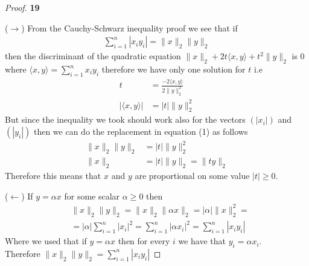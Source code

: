 \documentclass[11pt]{article}
\theoremstyle{definition}
\begin{document}
\cleardoublepage
	\begin{proof}{\textbf{19}}
        
        ($\rightarrow$) From the Cauchy-Schwarz inequality proof we see that if
        \begin{align}
            \sum_{i=1}^n |x_i y_i| = \|x\|_2 \|y\|_2
        \end{align}
        then the discriminant of the quadratic equation
        $\|x\|_2 + 2t\langle x,y \rangle + t^2 \|y\|_2$ is 0 where
        $\langle x,y \rangle = \sum_{i=1}^n x_iy_i$ therefore we have only one
        solution for $t$ i.e 
        \begin{align*}
            t &= \frac{-2\langle x,y \rangle}{2\|y\|_2^2}\\
            |\langle x,y \rangle| &= |t|\|y\|_2^2
        \end{align*}
        But since the inequality we took should work also for the vectors $(|x_i|)$
        and $(|y_i|)$ then we can do the replacement in equation (1) as follows
        \begin{align*}
            \|x\|_2\|y\|_2 &= |t|\|y\|_2^2\\
            \|x\|_2 &= |t|\|y\|_2 = \|ty\|_2
        \end{align*}
        Therefore this means that $x$ and $y$ are proportional on some value
        $|t| \geq 0$.

        ($\leftarrow$) If $y = \alpha x$ for some scalar $\alpha \geq 0$ then
        \begin{align*}
            &\|x\|_2\|y\|_2 = \|x\|_2\|\alpha x\|_2 = |\alpha|\|x\|_2^2 =\\
            & =|\alpha|\sum_{i=1}^n |x_i|^2 = \sum_{i=1}^n |\alpha x_i|^2 =
            \sum_{i=1}^n |x_i y_i|
        \end{align*}
        Where we used that if $y = \alpha x$ then for every $i$ we have that
        $y_i = \alpha x_i$.\\
        Therefore $\|x\|_2\|y\|_2 = \sum_{i=1}^n |x_i y_i|$
    \end{proof}
\cleardoublepage
\end{document}
